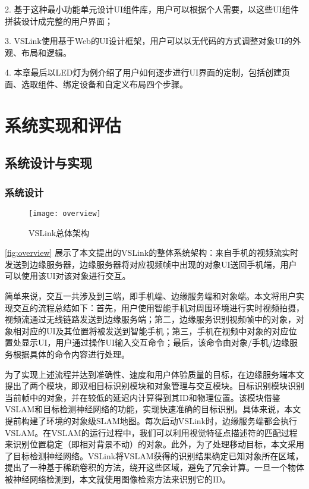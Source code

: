 2. 基于这种最小功能单元设计UI组件库，用户可以根据个人需要，以这些UI组件拼装设计成完整的用户界面；

3. VSLink使用基于Web的UI设计框架，用户可以以无代码的方式调整对象UI的外观、布局和逻辑。

4. 本章最后以LED灯为例介绍了用户如何逐步进行UI界面的定制，包括创建页面、选取组件、绑定设备和自定义布局四个步骤。

\chapter{系统实现和评估}
\label{chap:eval}

\section{系统设计与实现}
\subsection{系统设计}
\label{sec:arch}

\begin{figure}[htbp]
	\centering
	\texttt{[image: overview]}
	\caption{VSLink总体架构}
	\label{fig:overview}
\end{figure}

\autoref{fig:overview} 展示了本文提出的VSLink的整体系统架构：来自手机的视频流实时发送到边缘服务器，边缘服务器将对应视频帧中出现的对象UI送回手机端，用户可以使用该UI对该对象进行交互。

简单来说，交互一共涉及到三端，即手机端、边缘服务端和对象端。本文将用户实现交互的流程总结如下：首先，用户使用智能手机对周围环境进行实时视频拍摄，视频流通过无线链路发送到边缘服务端；第二，边缘服务识别视频帧中的对象，对象相对应的UI及其位置将被发送到智能手机；第三，手机在视频中对象的对应位置处显示UI，用户通过操作UI输入交互命令；最后，该命令由对象/手机/边缘服务根据具体的命令内容进行处理。

为了实现上述流程并达到准确性、速度和用户体验质量的目标，在边缘服务端本文提出了两个模块，即双相目标识别模块和对象管理与交互模块。目标识别模块识别当前帧中的对象，并在较低的延迟内计算得到其ID和物理位置。该模块借鉴VSLAM和目标检测神经网络的功能，实现快速准确的目标识别。具体来说，本文提前构建了环境的对象级SLAM地图。每次启动VSLink时，边缘服务端都会执行VSLAM。在VSLAM的运行过程中，我们可以利用视觉特征点描述符的匹配过程来识别位置稳定（即相对背景不动）的对象。此外，为了处理移动目标，本文采用了目标检测神经网络。VSLink将VSLAM获得的识别结果确定已知对象所在区域，提出了一种基于稀疏卷积的方法，绕开这些区域，避免了冗余计算。一旦一个物体被神经网络检测到，本文就使用图像检索方法来识别它的ID。

